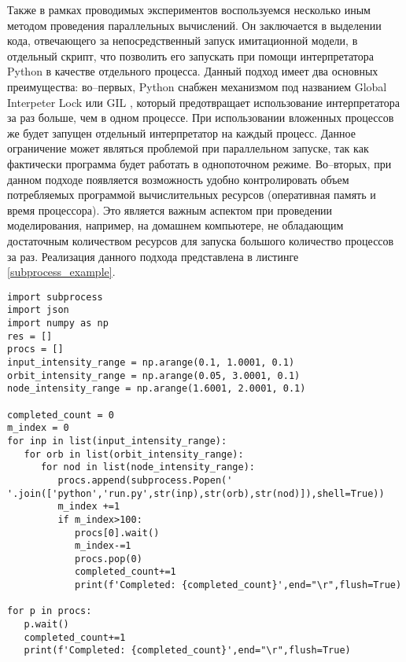 Также в рамках проводимых экспериментов воспользуемся несколько иным методом проведения параллельных вычислений. Он заключается в выделении кода, отвечающего за непосредственный запуск имитационной модели, в отдельный скрипт, что позволить его запускать при помощи интерпретатора Python в качестве отдельного процесса. Данный подход имеет два основных преимущества: во--первых, Python снабжен механизмом под названием Global Interpeter Lock или GIL \cite{gil}, который предотвращает использование интерпретатора за раз больше, чем в одном процессе. При использовании вложенных процессов же будет запущен отдельный интерпретатор на каждый процесс. Данное ограничение может являться проблемой при параллельном запуске, так как фактически программа будет работать в однопоточном режиме. Во--вторых, при данном подходе появляется возможность удобно контролировать объем потребляемых программой вычислительных ресурсов (оперативная память и время процессора). Это является важным аспектом при проведении моделирования, например, на домашнем компьютере, не обладающим достаточным количеством ресурсов для запуска большого количество процессов за раз. Реализация данного подхода представлена в листинге \ref{subprocess_example}.

\begin{lstlisting}
import subprocess
import json
import numpy as np
res = []
procs = []
input_intensity_range = np.arange(0.1, 1.0001, 0.1)
orbit_intensity_range = np.arange(0.05, 3.0001, 0.1)
node_intensity_range = np.arange(1.6001, 2.0001, 0.1)

completed_count = 0
m_index = 0
for inp in list(input_intensity_range):
   for orb in list(orbit_intensity_range):
      for nod in list(node_intensity_range):
         procs.append(subprocess.Popen(' '.join(['python','run.py',str(inp),str(orb),str(nod)]),shell=True))
         m_index +=1
         if m_index>100:
            procs[0].wait()
            m_index-=1
            procs.pop(0)
            completed_count+=1
            print(f'Completed: {completed_count}',end="\r",flush=True)

for p in procs:
   p.wait()
   completed_count+=1
   print(f'Completed: {completed_count}',end="\r",flush=True)
\end{lstlisting}

